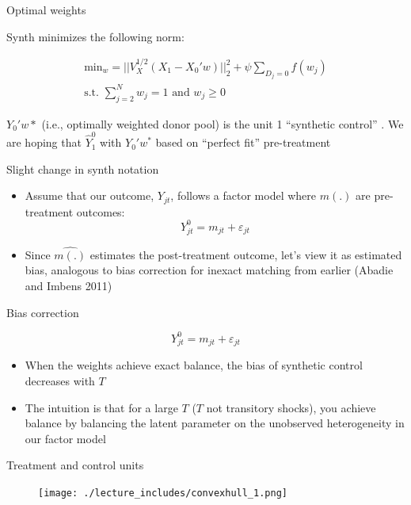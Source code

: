 \documentclass{beamer}
\begin{document}
\begin{frame}{Optimal weights}

Synth minimizes the following norm:

\begin{eqnarray*}
\textrm{min}_w = || V_X^{1/2} (X_1 - X_0'w) ||_2^2 + \psi \sum_{D_j=0}f(w_j)\\
\textrm{s.t. }\sum_{j=2}^N w_{j} =1 \textrm{ and } w_j \geq 0
\end{eqnarray*}

$Y_0'w*$ (i.e., optimally weighted donor pool) is the unit 1 ``synthetic control'' .  We are hoping that $\widehat{Y}_1^0$ with $Y_0' {w}^{*}$ based on ``perfect fit'' pre-treatment


\end{frame}


\begin{frame}{Slight change in synth notation}

\begin{itemize}
\item Assume that our outcome, $Y_{jt}$, follows a factor model where $m(.)$ are pre-treatment outcomes: $$ Y_{jt}^0 = m_{jt} + \varepsilon_{jt}$$
\item Since $\widehat{m(.)}$ estimates the post-treatment outcome, let's view it as estimated bias, analogous to bias correction for inexact matching from earlier (Abadie and Imbens 2011)
\end{itemize}

\end{frame}



\begin{frame}{Bias correction}

 $$ Y_{jt}^0 = m_{jt} + \varepsilon_{jt}$$

\begin{itemize}
\item When the weights achieve exact balance, the bias of synthetic control decreases with $T$
\item The intuition is that for a large $T$ ($T$ not transitory shocks), you achieve balance by balancing the latent parameter on the unobserved heterogeneity in our factor model
\end{itemize}

\end{frame}


\begin{frame}{Treatment and control units}

	\begin{figure}
	\texttt{[image: ./lecture\_includes/convexhull\_1.png]}
	\end{figure}

\end{frame}
\end{document}
